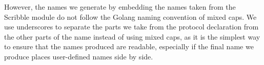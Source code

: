 \documentclass[12pt,twoside]{report}
\begin{document}
However, the names we generate by embedding the names taken from the Scribble module do not follow the Golang naming convention of mixed caps. We use underscores to separate the parts we take from the protocol declaration from the other parts of the name instead of using mixed caps, as it is the simplest way to ensure that the names produced are readable, especially if the final name we produce places user-defined names side by side.










\end{document}
